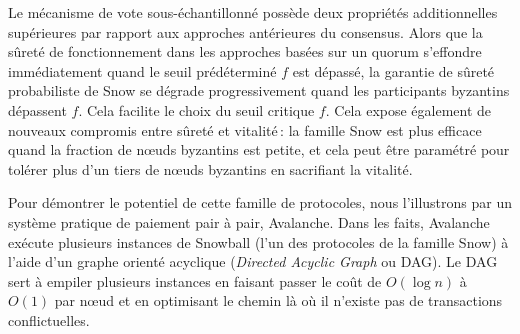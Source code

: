 \documentclass[a4,twocolumn,10pt]{article}
\newcommand{\Oh}[1]{O(#1)}
\newcommand{\editchange}[1]{{\color{orange}#1}}
\theoremstyle{definition}
\begin{document}
Le mécanisme de vote sous-échantillonné possède deux propriétés additionnelles supérieures par rapport aux approches antérieures du consensus.
Alors que la sûreté de fonctionnement dans les approches basées sur un quorum s'effondre immédiatement quand le seuil prédéterminé $f$ est dépassé,
la garantie de sûreté probabiliste de Snow se dégrade progressivement quand les participants byzantins dépassent $f$.
Cela facilite le choix du seuil critique $f$.
Cela expose également de nouveaux compromis entre sûreté et vitalité\,: la famille Snow est plus efficace quand la fraction de nœuds byzantins est petite, et cela peut être paramétré pour tolérer plus d'un tiers de nœuds byzantins en sacrifiant la vitalité.

Pour démontrer le potentiel de cette famille de protocoles, nous l'illustrons par un système pratique de paiement pair à pair, Avalanche. Dans les faits, Avalanche exécute plusieurs instances de Snowball (l'un des protocoles de la famille Snow) à l'aide d'un graphe orienté acyclique (\emph{Directed Acyclic Graph} ou DAG). Le DAG sert à empiler plusieurs instances en faisant passer le coût de $\Oh{\log{n}}$ à $\Oh{1}$ par nœud et en optimisant le chemin là où il n'existe pas de transactions conflictuelles.
%
\end{document}

